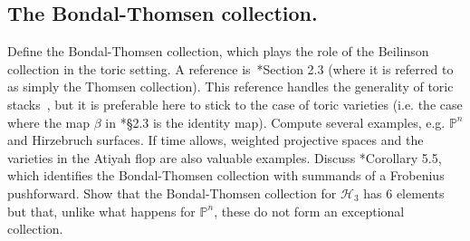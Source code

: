 \documentclass[11pt]{amsart}
\numberwithin{equation}{section}
\theoremstyle{definition}
\theoremstyle{remark}
\newcommand{\PP}{\mathbb P}
\newcommand{\QQ}{\mathbb Q}
\begin{document}
\subsection{The Bondal-Thomsen collection.}
Define the Bondal-Thomsen collection, which plays the role of the Beilinson collection in the toric setting. A reference is~\cite{HHL}*{Section 2.3} (where it is referred to as simply the Thomsen collection). This reference handles the generality of toric stacks~\cite{GS}, but it is preferable here to stick to the case of toric varieties (i.e. the case where the map $\beta$ in \cite{HHL}*{\S 2.3} is the identity map). Compute several examples, e.g. $\PP^n$ and Hirzebruch surfaces. If time allows, weighted projective spaces and the varieties in the Atiyah flop are also valuable examples. Discuss \cite{HHL}*{Corollary 5.5}, which identifies the Bondal-Thomsen collection with summands of a Frobenius pushforward. 
Show that the  Bondal-Thomsen collection for $\mathcal H_3$ has $6$ elements but that, unlike what happens for $\PP^n$, these do not form an exceptional collection.


\end{document}
